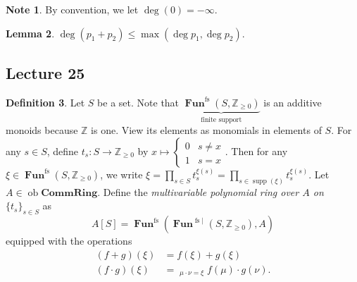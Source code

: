 \documentclass[10pt,letterpaper,cm]{nupset}
\theoremstyle{definition}
\newtheorem{definition}{Definition}[subsection]
\newtheorem{note}[definition]{Note}
\theoremstyle{theorem}
\newtheorem{lemma}[definition]{Lemma}
\theoremstyle{remark}
\newcommand{\Z}{\mathbb Z}
\newcommand{\1}{\mathbf{1}}
\newcommand{\0}{\vec 0}
\DeclareMathOperator{\ob}{ob}
\DeclareMathOperator{\fs}{fs}
\DeclareMathOperator{\Fun}{\mathbf{Fun}}
\DeclareMathOperator{\supp}{supp}
\begin{document}
\begin{note}
By convention, we let $\deg(0)= {-}\infty$.
\end{note}

\begin{lemma}
$\deg(p_1 + p_2) \leq \max(\deg p_1, \deg p_2)$.
\end{lemma}

\subsection{Lecture 25}

\begin{definition}
Let $S$ be a set. Note that $\underbrace{\Fun^{\fs}(S, \Z_{\geq 0})}_{\text{finite support}}$ is an additive monoids because $\Z$ is one. View its elements as monomials in elements of $S$. For any $s\in S$, define $t_s : S \to \Z_{\geq 0}$ by $x \mapsto \begin{cases} 0 & s \ne x \\ 1 & s =x \end{cases}.$ Then for any $\xi \in \Fun^{\fs}(S, \Z_{\geq 0})$, we write $\xi = \prod_{s\in S}t_s^{\xi(s)} =\prod_{s\in \supp(\xi)}t_s^{\xi(s)}$.
Let $A \in \ob \mathbf{CommRing}$. Define the \textit{multivariable polynomial ring over $A$ on $\{t_s\}_{s\in S}$} as $$A[S] = \Fun^{\fs}(\Fun^{\fs|}(S, \Z_{\geq 0}), A)$$ equipped with the operations
\begin{align*}
(f+g)(\xi) &= f(\xi) +g(\xi)
\\ (f\cdot g)(\xi) & = \mathop{\sum_{\mu, \nu}}_{\mu \cdot \nu = \xi} f(\mu) \cdot g(\nu).
\end{align*}
\end{definition}
\end{document}
